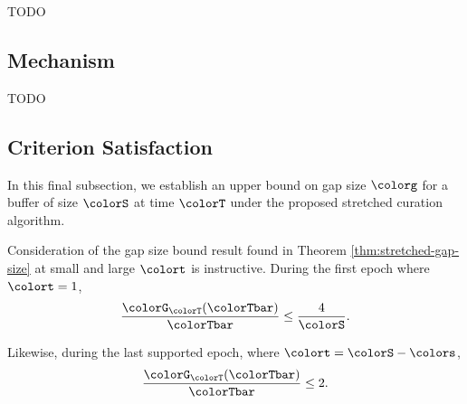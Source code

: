 
TODO


\subsection{Mechanism}



TODO

\subsection{Criterion Satisfaction}

In this final subsection, we establish an upper bound on gap size $\colorg$ for a buffer of size $\colorS$ at time $\colorT$ under the proposed stretched curation algorithm.





Consideration of the gap size bound result found in Theorem \ref{thm:stretched-gap-size} at small and large $\colort$ is instructive.
During the first epoch where $\colort = 1$,
\begin{align*}
\frac{\colorG_{\colorT}(\colorTbar)}{\colorTbar}
\leq
\frac{4}{\colorS}.
\end{align*}

Likewise, during the last supported epoch, where $\colort = \colorS - \colors$,
\begin{align*}
\frac{\colorG_{\colorT}(\colorTbar)}{\colorTbar}
\leq
2.
\end{align*}
